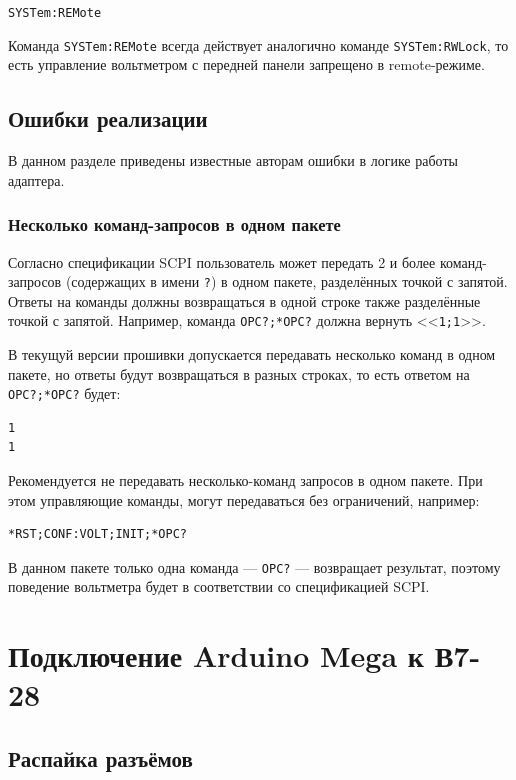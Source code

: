 \documentclass[12pt, a4paper]{article}
\newcommand{\V}{\mbox{В7-28}}
\newcommand{\Arduino}{Arduino Mega}
\newcommand{\CMD}[1]{{\tt #1}}
\newcommand{\RESPONSE}[1]{<<{\tt #1}>>}
\newcommand{\CMDSECTION}[1]{\CMD{#1}  }
\begin{document}
\CMDSECTION{SYSTem:REMote}

Команда \CMD{SYSTem:REMote} всегда действует аналогично команде \CMD{SYSTem:RWLock}, то есть управление вольтметром с передней панели запрещено в remote-режиме.

\subsection{Ошибки реализации}

В данном разделе приведены известные авторам ошибки в логике работы адаптера.

\subsubsection{Несколько команд-запросов в одном пакете}

Согласно спецификации SCPI пользователь может передать 2 и более команд-запросов (содержащих в имени \CMD{?}) в одном пакете, разделённых точкой с запятой. Ответы на команды должны возвращаться в одной строке также разделённые точкой с запятой. Например, команда \CMD{*OPC?;*OPC?}
должна вернуть \RESPONSE{1;1}.

В текущуй версии прошивки допускается передавать несколько команд в одном пакете, но ответы будут возвращаться в разных строках, то есть ответом на \CMD{*OPC?;*OPC?} будет:

\begin{verbatim}
1
1
\end{verbatim}

Рекомендуется не передавать несколько-команд запросов в одном пакете. При этом управляющие команды, могут передаваться без ограничений, например: 

\begin{verbatim}
*RST;CONF:VOLT;INIT;*OPC?
\end{verbatim}

В данном пакете только одна команда --- \CMD{*OPC?} --- возвращает результат, поэтому поведение вольтметра будет в соответствии со спецификацией SCPI.

\section{Подключение {\Arduino} к \V}

\subsection{Распайка разъёмов}
\end{document}
